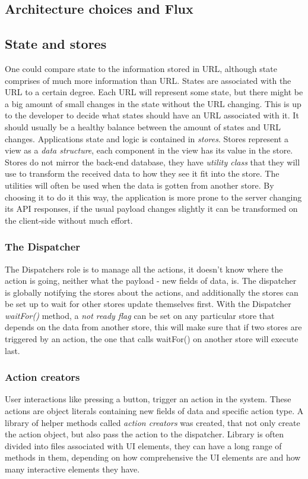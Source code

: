 \subsection{Architecture choices and Flux}

\subsection*{State and stores}
One could compare state to the information stored in URL, although state comprises of much more information than URL. States are associated with the URL to a certain degree. Each URL will represent some state, but there might be a big amount of small changes in the state without the URL changing. This is up to the developer to decide what states should have an URL associated with it. It should usually be a healthy balance between the amount of states and URL changes.
Applications state and logic is contained in \emph{stores}. Stores represent a view as a \emph{data structure}, each component in the view has its value in the store. Stores do not mirror the back-end database, they have \emph{utility class} that they will use to transform the received data to how they see it fit into the store. The utilities will often be used when the data is gotten from another store. By choosing it to do it this way, the application is more prone to the server changing its API responses, if the usual payload changes slightly it can be transformed on the client-side without much effort.

\subsubsection*{The Dispatcher}
The Dispatchers role is to manage all the actions, it doesn't know where the action is going, neither what the payload - new fields of data, is. The dispatcher is globally notifying the stores about the actions, and additionally the stores can be set up to wait for other stores update themselves first. With the Dispatcher \emph{waitFor()} method, a \emph{not ready flag} can be set on any particular store that depends on the data from another store, this will make sure that if two stores are triggered by an action, the one that calls waitFor() on another store will execute last. 

\subsubsection*{Action creators}
User interactions like pressing a button, trigger an action in the system. These actions are object literals containing new fields of data and specific action type. A library of helper methods called \emph{action creators} was created, that not only create the action object, but also pass the action to the dispatcher. Library is often divided into files associated with UI elements, they can have a long range of methods in them, depending on how comprehensive the UI elements are and how many interactive elements they have.

